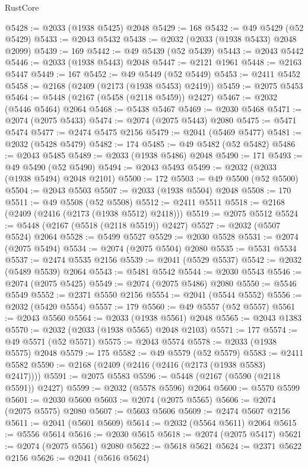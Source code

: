 \begin{lexlean}{RustCore}
\begin{coremodule}
@5428 := @2033 (@1938 @5425) @2048
@5429 := 168
@5432 := @49 @5429 (@52 @5429)
@5433 := @2043 @5432
@5438 := @2032 (@2033 (@1938 @5433) @2048 @2099)
@5439 := 169
@5442 := @49 @5439 (@52 @5439)
@5443 := @2043 @5442
@5446 := @2033 (@1938 @5443) @2048
@5447 := @2121 @1961
@5448 := @2163 @5447
@5449 := 167
@5452 := @49 @5449 (@52 @5449)
@5453 := @2411 @5452
@5458 := @2168 (@2409 (@2173 (@1938 @5453) @2419))
@5459 := @2075 @5453
@5464 := @5448 (@2167 (@5458 (@2118 @5459)) @2427)
@5467 := @2032 (@5446 @5464) @2064
@5468 := @5438 @5467
@5469 := @2030 @5468
@5471 := @2074 (@2075 @5433)
@5474 := @2074 (@2075 @5443) @2080
@5475 := @5471 @5474
@5477 := @2474 @5475 @2156
@5479 := @2041 (@5469 @5477)
@5481 := @2032 (@5428 @5479)
@5482 := 174
@5485 := @49 @5482 (@52 @5482)
@5486 := @2043 @5485
@5489 := @2033 (@1938 @5486) @2048
@5490 := 171
@5493 := @49 @5490 (@52 @5490)
@5494 := @2043 @5493
@5499 := @2032 (@2033 (@1938 @5494) @2048 @2101)
@5500 := 172
@5503 := @49 @5500 (@52 @5500)
@5504 := @2043 @5503
@5507 := @2033 (@1938 @5504) @2048
@5508 := 170
@5511 := @49 @5508 (@52 @5508)
@5512 := @2411 @5511
@5518 := @2168 (@2409 (@2416 (@2173 (@1938 @5512) @2418)))
@5519 := @2075 @5512
@5524 := @5448 (@2167 (@5518 (@2118 @5519)) @2427)
@5527 := @2032 (@5507 @5524) @2064
@5528 := @5499 @5527
@5529 := @2030 @5528
@5531 := @2074 (@2075 @5494)
@5534 := @2074 (@2075 @5504) @2080
@5535 := @5531 @5534
@5537 := @2474 @5535 @2156
@5539 := @2041 (@5529 @5537)
@5542 := @2032 (@5489 @5539) @2064
@5543 := @5481 @5542
@5544 := @2030 @5543
@5546 := @2074 (@2075 @5425)
@5549 := @2074 (@2075 @5486) @2080
@5550 := @5546 @5549
@5552 := @2371 @5550 @2156
@5554 := @2041 (@5544 @5552)
@5556 := @2032 (@5420 @5554)
@5557 := 179
@5560 := @49 @5557 (@52 @5557)
@5561 := @2043 @5560
@5564 := @2033 (@1938 @5561) @2048
@5565 := @2043 @1383
@5570 := @2032 (@2033 (@1938 @5565) @2048 @2103)
@5571 := 177
@5574 := @49 @5571 (@52 @5571)
@5575 := @2043 @5574
@5578 := @2033 (@1938 @5575) @2048
@5579 := 175
@5582 := @49 @5579 (@52 @5579)
@5583 := @2411 @5582
@5590 := @2168 (@2409 (@2416 (@2416 (@2173 (@1938 @5583) @2417))))
@5591 := @2075 @5583
@5596 := @5448 (@2167 (@5590 (@2118 @5591)) @2427)
@5599 := @2032 (@5578 @5596) @2064
@5600 := @5570 @5599
@5601 := @2030 @5600
@5603 := @2074 (@2075 @5565)
@5606 := @2074 (@2075 @5575) @2080
@5607 := @5603 @5606
@5609 := @2474 @5607 @2156
@5611 := @2041 (@5601 @5609)
@5614 := @2032 (@5564 @5611) @2064
@5615 := @5556 @5614
@5616 := @2030 @5615
@5618 := @2074 (@2075 @5417)
@5621 := @2074 (@2075 @5561) @2080
@5622 := @5618 @5621
@5624 := @2371 @5622 @2156
@5626 := @2041 (@5616 @5624)

\end{coremodule}
\end{lexlean}
